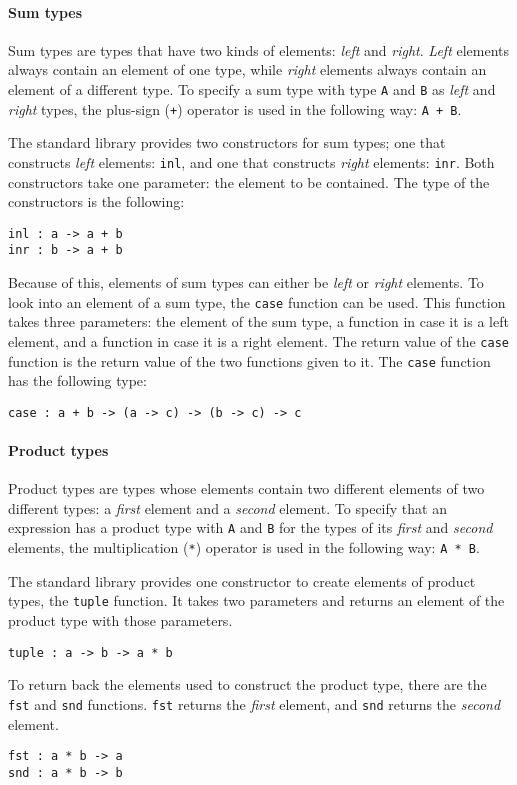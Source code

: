 \documentclass[12pt]{article}
\begin{document}
\paragraph{Sum types} Sum types are types that have two kinds of elements:
\emph{left} and \emph{right}. \emph{Left} elements always contain an element of
one type, while \emph{right} elements always contain an element of a different
type. To specify a sum type with type \verb$A$ and \verb$B$ as \emph{left} and
\emph{right} types, the plus-sign (\verb$+$) operator is used in the
following way: \verb$A + B$.

The standard library provides two constructors for sum types; one that
constructs \emph{left} elements: \verb$inl$, and one that constructs
\emph{right} elements: \verb$inr$. Both constructors take one parameter: the
element to be contained. The type of the constructors is the following:
\begin{lstlisting}
inl : a -> a + b
inr : b -> a + b
\end{lstlisting}
Because of this, elements of sum types can either be \emph{left} or \emph{right}
elements. To look into an element of a sum type, the \verb$case$ function can be
used. This function takes three parameters: the element of the sum type, a
function in case it is a left element, and a function in case it is a right
element. The return value of the \verb$case$ function is the return value of the
two functions given to it. The \verb$case$ function has the following type:
\begin{lstlisting}
case : a + b -> (a -> c) -> (b -> c) -> c
\end{lstlisting}

\paragraph{Product types} Product types are types whose elements contain two
different elements of two different types: a \emph{first} element and a
\emph{second} element. To specify that an expression has a product type with
\verb$A$ and \verb$B$ for the types of its \emph{first} and \emph{second}
elements, the multiplication (\verb$*$) operator is used in the following way:
\verb$A * B$.

The standard library provides one constructor to create elements of product
types, the \verb$tuple$ function. It takes two parameters and returns an element
of the product type with those parameters.
\begin{lstlisting}
tuple : a -> b -> a * b
\end{lstlisting}
To return back the elements used to construct the product type, there are the
\verb$fst$ and \verb$snd$ functions. \verb$fst$ returns the \emph{first}
element, and \verb$snd$ returns the \emph{second} element.
\begin{lstlisting}
fst : a * b -> a
snd : a * b -> b
\end{lstlisting}
\end{document}
